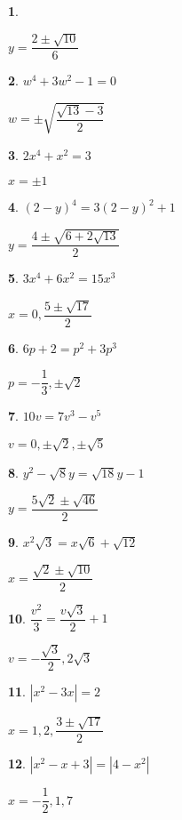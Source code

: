 \documentclass{amsbook}
\newtheorem{exc}{}
\newenvironment{ex}{\begin{exc}\normalfont}{\end{exc}}
\numberwithin{section}{chapter}
\numberwithin{equation}{chapter}
\begin{document}
\begin{multicols}{2}
\begin{ex}
\begin{sol}
	$y = \dfrac{2 \pm \sqrt{10}}{6}$	
	\end{sol}
\end{ex}
\begin{ex}
	$w^4 + 3w^2 - 1 = 0$
	\begin{sol}
		 $w = \pm \sqrt{\dfrac{\sqrt{13} - 3}{2}}$
	\end{sol}
\end{ex}
\begin{ex}
	$2x^4 +x^2 = 3$
	\begin{sol}
		$x = \pm 1$
	\end{sol}
\end{ex}
\begin{ex}
	$(2-y)^4 = 3(2-y)^2 + 1$
	\begin{sol}
		$y = \dfrac{4 \pm \sqrt{6 + 2 \sqrt{13}}}{2}$
	\end{sol}
\end{ex}
\begin{ex}
	$3x^4 + 6x^2 = 15x^3$
	\begin{sol}
		$x = 0, \dfrac{5 \pm \sqrt{17}}{2}$
	\end{sol}
\end{ex}
\begin{ex}
	$6p + 2 = p^2 + 3p^3$
	\begin{sol}
		$p = -\dfrac{1}{3}, \pm \sqrt{2}$ 
	\end{sol}
\end{ex}
\begin{ex}
	$10v = 7v^3 - v^5$
	\begin{sol}
		$v = 0, \pm \sqrt{2}, \pm \sqrt{5}$
	\end{sol}
\end{ex}
\begin{ex}
	$y^2 - \sqrt{8} y = \sqrt{18} y - 1$
	\begin{sol}
		$y = \dfrac{5\sqrt{2} \pm \sqrt{46}}{2}$
	\end{sol}
\end{ex}
\begin{ex}
	$x^2 \sqrt{3} = x \sqrt{6} + \sqrt{12}$
	\begin{sol}
		$x = \dfrac{\sqrt{2} \pm \sqrt{10}}{2}$
	\end{sol}
\end{ex}
\begin{ex}
	$\dfrac{v^2}{3} = \dfrac{v \sqrt{3}}{2} + 1$
	\begin{sol}
		$v = -\dfrac{\sqrt{3}}{2}, 2\sqrt{3}$
	\end{sol}
\end{ex}
\begin{ex}
	$|x^2 - 3x| = 2$
	\begin{sol}
		$x = 1, 2, \dfrac{3 \pm \sqrt{17}}{2}$
	\end{sol}
\end{ex}
\begin{ex}
	$|x^2 -x + 3| = |4-x^2|$
	\begin{sol}
		$x = -\dfrac{1}{2}, 1, 7$
	\end{sol}
\end{ex}
\end{multicols}
\end{document}
